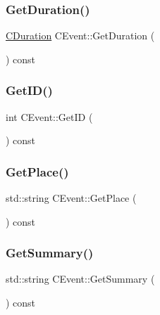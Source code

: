 \mbox{\label{class_c_event_ab4618cf318c9f54d538495d563394426}} 
\subsubsection{\texorpdfstring{Get\+Duration()}{GetDuration()}}
{\footnotesize\ttfamily \mbox{\hyperlink{class_c_duration}{C\+Duration}} C\+Event\+::\+Get\+Duration (\begin{DoxyParamCaption}{ }\end{DoxyParamCaption}) const}

\mbox{\label{class_c_event_a59c9565b549ffaca271d4a627171bbde}} 
\subsubsection{\texorpdfstring{Get\+I\+D()}{GetID()}}
{\footnotesize\ttfamily int C\+Event\+::\+Get\+ID (\begin{DoxyParamCaption}{ }\end{DoxyParamCaption}) const\hspace{0.3cm}{\ttfamily [inline]}}

\mbox{\label{class_c_event_a3a69c56877cd35d5b0199656801ddb58}} 
\subsubsection{\texorpdfstring{Get\+Place()}{GetPlace()}}
{\footnotesize\ttfamily std\+::string C\+Event\+::\+Get\+Place (\begin{DoxyParamCaption}{ }\end{DoxyParamCaption}) const\hspace{0.3cm}{\ttfamily [inline]}}

\mbox{\label{class_c_event_aa29013fcec20a717e1a9b6e8ab302fc9}} 
\subsubsection{\texorpdfstring{Get\+Summary()}{GetSummary()}}
{\footnotesize\ttfamily std\+::string C\+Event\+::\+Get\+Summary (\begin{DoxyParamCaption}{ }\end{DoxyParamCaption}) const\hspace{0.3cm}{\ttfamily [inline]}}

